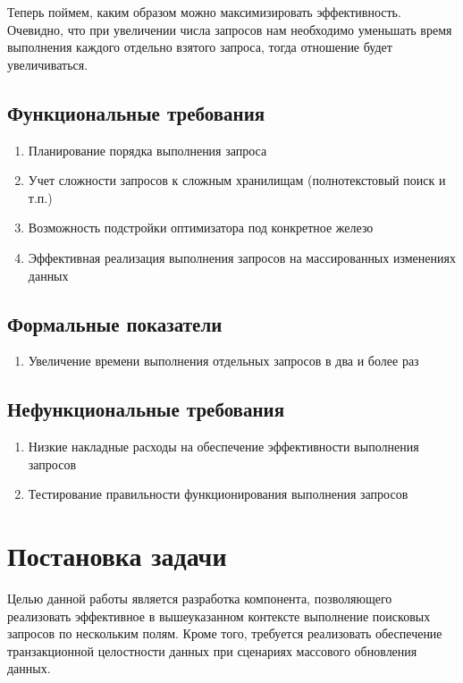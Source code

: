 \documentclass{matmex-diploma}
\begin{document}
    Теперь поймем, каким образом можно максимизировать эффективность. Очевидно, что при увеличении числа запросов нам необходимо уменьшать время выполнения каждого отдельно взятого запроса, тогда отношение будет увеличиваться.

\subsection{Функциональные требования}
    \begin{enumerate}\itemsep1pt \parskip0pt 
        \item Планирование порядка выполнения запроса
        \item Учет сложности запросов к сложным хранилищам (полнотекстовый поиск и т.п.)
        \item Возможность подстройки оптимизатора под конкретное железо
        \item Эффективная реализация выполнения запросов на массированных изменениях данных
    \end{enumerate}
\subsection{Формальные показатели}
    \begin{enumerate}\itemsep1pt \parskip0pt  
        \item Увеличение времени выполнения отдельных запросов в два и более раз
    \end{enumerate}
\subsection{Нефункциональные требования}
    \begin{enumerate}\itemsep1pt \parskip0pt  
            \item Низкие накладные расходы на обеспечение эффективности выполнения запросов
            \item Тестирование правильности функционирования выполнения запросов
    \end{enumerate}

\section{Постановка задачи}
    Целью данной работы является разработка компонента, позволяющего реализовать эффективное в вышеуказанном контексте выполнение поисковых запросов по нескольким полям. Кроме того, требуется реализовать обеспечение транзакционной целостности данных при сценариях массового обновления данных. 
\end{document}
